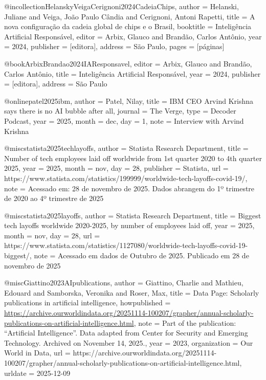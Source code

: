 {@incollection{HelanskyVeigaCerignoni2024CadeiaChips,
  author = {Helanski, Juliane and Veiga, João Paulo Cândia and Cerignoni, Antoni Rapetti},
  title = {A nova configuração da cadeia global de chips e o {Brasil}},
  booktitle = {Inteligência Artificial Responsável},
  editor = {Arbix, Glauco and Brandão, Carlos Antônio},
  year = {2024},
  publisher = {[editora]},
  address = {São Paulo},
  pages = {[páginas]}
}

@book{ArbixBrandao2024IAResponsavel,
  editor = {Arbix, Glauco and Brandão, Carlos Antônio},
  title = {Inteligência Artificial Responsável},
  year = {2024},
  publisher = {[editora]},
  address = {São Paulo}
}

@online{patel2025ibm,
  author = {Patel, Nilay},
  title = {IBM CEO Arvind Krishna says there is no AI bubble after all},
  journal = {The Verge},
  type = {Decoder Podcast},
  year = {2025},
  month = {dec},
  day = {1},
  note = {Interview with Arvind Krishna}
}

@misc{statista2025techlayoffs,
  author       = {{Statista Research Department}},
  title        = {Number of tech employees laid off worldwide from 1st quarter 2020 to 4th quarter 2025},
  year         = {2025},
  month        = {nov},
  day          = {28},
  publisher    = {Statista},
  url          = {https://www.statista.com/statistics/199999/worldwide-tech-layoffs-covid-19/},
  note         = {Acessado em: 28 de novembro de 2025. Dados abrangem do 1º trimestre de 2020 ao 4º trimestre de 2025}
}

@misc{statista2025layoffs,
  author       = {{Statista Research Department}},
  title        = {Biggest tech layoffs worldwide 2020-2025, by number of employees laid off},
  year         = {2025},
  month        = {nov},
  day          = {28},
  url          = {https://www.statista.com/statistics/1127080/worldwide-tech-layoffs-covid-19-biggest/},
  note         = {Acessado em dados de Outubro de 2025. Publicado em 28 de novembro de 2025}
}

@misc{Giattino2023AIpublications,
    author = {Giattino, Charlie and Mathieu, Edouard and Samborska, Veronika and Roser, Max},
    title = {Data Page: Scholarly publications in artificial intelligence},
    howpublished = {\url{https://archive.ourworldindata.org/20251114-100207/grapher/annual-scholarly-publications-on-artificial-intelligence.html}},
    note = {Part of the publication: ``Artificial Intelligence''. Data adapted from Center for Security and Emerging Technology. Archived on November 14, 2025.},
    year = {2023},
    organization = {Our World in Data},
    url = {https://archive.ourworldindata.org/20251114-100207/grapher/annual-scholarly-publications-on-artificial-intelligence.html},
    urldate = {2025-12-09}
}

}

